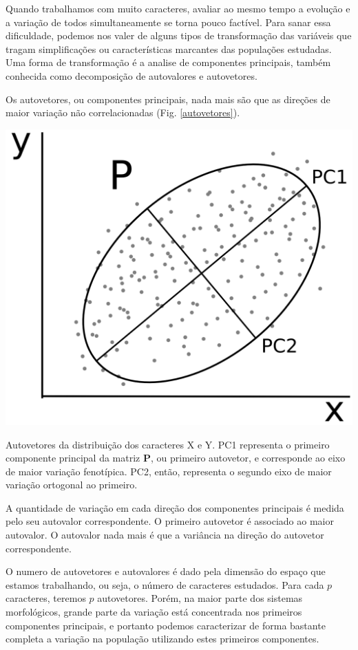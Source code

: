 \documentclass[portuges,]{tufte-handout}
\begin{document}
Quando trabalhamos com muito caracteres, avaliar ao mesmo tempo a
evolução e a variação de todos simultaneamente se torna pouco factível.
Para sanar essa dificuldade, podemos nos valer de alguns tipos de
transformação das variáveis que tragam simplificações ou características
marcantes das populações estudadas. Uma forma de transformação é a
analise de componentes principais, também conhecida como decomposição de
autovalores e autovetores.

Os autovetores, ou componentes principais, nada mais são que as direções
de maior variação não correlacionadas (Fig. \ref{autovetores}).

\begin{marginfigure}
\includegraphics{./figuras/auto-vetores.png}
\caption{Autovetores da distribuição dos caracteres X e Y. PC1
representa o primeiro componente principal da matriz \(\mathbf{P}\), ou
primeiro autovetor, e corresponde ao eixo de maior variação fenotípica.
PC2, então, representa o segundo eixo de maior variação ortogonal ao
primeiro.}
\label{autovetores}
\end{marginfigure}

A quantidade de variação em cada direção dos componentes principais é
medida pelo seu autovalor correspondente. O primeiro autovetor é
associado ao maior autovalor. O autovalor nada mais é que a variância na
direção do autovetor correspondente.

O numero de autovetores e autovalores é dado pela dimensão do espaço que
estamos trabalhando, ou seja, o número de caracteres estudados. Para
cada $p$ caracteres, teremos $p$ autovetores. Porém, na maior parte dos
sistemas morfológicos, grande parte da variação está concentrada nos
primeiros componentes principais, e portanto podemos caracterizar de
forma bastante completa a variação na população utilizando estes
primeiros componentes.
\end{document}
